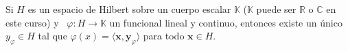 

\begin{myteo}
Si $H$ es un espacio de Hilbert sobre un cuerpo escalar $\mathbb{K}$
($\mathbb{K}$ puede ser $\mathbb{R}$ o $\mathbb{C}$ en este curso)
y \ $\varphi: H \rightarrow \mathbb{K}$ un funcional lineal y continuo,
entonces existe un \'unico $y_{\varphi}\in H$ tal que
$\varphi(x)= \langle \mathbf{x},\mathbf{y}_{\varphi}\rangle$ para todo
$\mathbf{x}\in H$.
\end{myteo}


